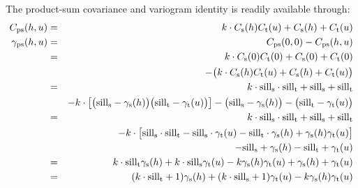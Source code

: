 The product-sum covariance and variogram identity is readily available through:
\begin{eqnarray*}
C_{\rm ps}(h,u) &=& k \cdot C_{\rm s}(h)C_{\rm t}(u) + C_{\rm s}(h) + C_{\rm t}(u) \\
\gamma_{\rm ps}(h,u) &=& C_{\rm ps}(0,0) - C_{\rm ps}(h,u) \\
 &=& k \cdot C_{\rm s}(0)C_{\rm t}(0) + C_{\rm s}(0) + C_{\rm t}(0) \\
 &  & - \big(k \cdot C_{\rm s}(h)C_{\rm t}(u) + C_{\rm s}(h) + C_{\rm t}(u)\big) \\
 &=& k \cdot {\rm sill}_{\rm s} \cdot {\rm sill}_{\rm t} + {\rm sill}_{\rm s} + {\rm sill}_{\rm t} \\
 &  & - k \cdot \big[ \big({\rm sill}_{\rm s} - \gamma_{\rm s}(h)\big)\big({\rm sill}_{\rm t} - \gamma_{\rm t}(u)\big)\big] - \big({\rm sill}_{\rm s} - \gamma_{\rm s}(h)\big) - \big({\rm sill}_{\rm t} - \gamma_{\rm t}(u)\big) \\
 &=&  k \cdot {\rm sill}_{\rm s} \cdot {\rm sill}_{\rm t} + {\rm sill}_{\rm s} + {\rm sill}_{\rm t} \\
 &   & - k \cdot \big[ {\rm sill}_{\rm s} \cdot {\rm sill}_{\rm t} - {\rm sill}_{\rm s} \cdot \gamma_{\rm t}(u) - {\rm sill}_{\rm t} \cdot \gamma_{\rm s}(h) + \gamma_{\rm s}(h) \gamma_{\rm t}(u) \big] \\
 & & - {\rm sill}_{\rm s} + \gamma_{\rm s}(h) - {\rm sill}_{\rm t} + \gamma_{\rm t}(u) \\
 &=& k \cdot {\rm sill}_{\rm t} \gamma_{\rm s}(h) + k \cdot {\rm sill}_{\rm s} \gamma_{\rm t}(u) - k \gamma_{\rm s}(h) \gamma_{\rm t}(u) + \gamma_{\rm s}(h) + \gamma_{\rm t}(u) \\
 &=& (k \cdot {\rm sill}_{\rm t} + 1) \gamma_{\rm s}(h) + (k \cdot {\rm sill}_{\rm s} + 1) \gamma_{\rm t}(u) - k \gamma_{\rm s}(h) \gamma_{\rm t}(u)
\end{eqnarray*}
